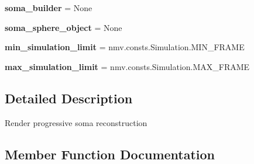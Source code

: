 \begin{DoxyCompactItemize}
\item 
{\bfseries soma\+\_\+builder} = None\hypertarget{classmeshy_1_1neuromorphovis_1_1interface_1_1ui_1_1soma__panel_1_1RenderSomaProgressive_a57cf0d9a86305ae7dae3ab8253dc5a78}{}\label{classmeshy_1_1neuromorphovis_1_1interface_1_1ui_1_1soma__panel_1_1RenderSomaProgressive_a57cf0d9a86305ae7dae3ab8253dc5a78}

\item 
{\bfseries soma\+\_\+sphere\+\_\+object} = None\hypertarget{classmeshy_1_1neuromorphovis_1_1interface_1_1ui_1_1soma__panel_1_1RenderSomaProgressive_a2ec05beaee487c779f84da8bdffad2eb}{}\label{classmeshy_1_1neuromorphovis_1_1interface_1_1ui_1_1soma__panel_1_1RenderSomaProgressive_a2ec05beaee487c779f84da8bdffad2eb}

\item 
{\bfseries min\+\_\+simulation\+\_\+limit} = nmv.\+consts.\+Simulation.\+M\+I\+N\+\_\+\+F\+R\+A\+ME\hypertarget{classmeshy_1_1neuromorphovis_1_1interface_1_1ui_1_1soma__panel_1_1RenderSomaProgressive_ae2cc268ce44f1b2c1e0a430ad87b65c3}{}\label{classmeshy_1_1neuromorphovis_1_1interface_1_1ui_1_1soma__panel_1_1RenderSomaProgressive_ae2cc268ce44f1b2c1e0a430ad87b65c3}

\item 
{\bfseries max\+\_\+simulation\+\_\+limit} = nmv.\+consts.\+Simulation.\+M\+A\+X\+\_\+\+F\+R\+A\+ME\hypertarget{classmeshy_1_1neuromorphovis_1_1interface_1_1ui_1_1soma__panel_1_1RenderSomaProgressive_a68420033f6c8f4fa2c422a79eef06a11}{}\label{classmeshy_1_1neuromorphovis_1_1interface_1_1ui_1_1soma__panel_1_1RenderSomaProgressive_a68420033f6c8f4fa2c422a79eef06a11}

\end{DoxyCompactItemize}


\subsection{Detailed Description}
\begin{DoxyVerb}Render progressive soma reconstruction\end{DoxyVerb}
 

\subsection{Member Function Documentation}
